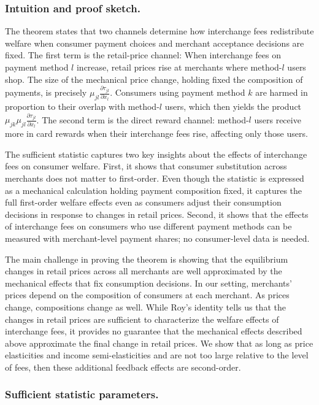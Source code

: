 \documentclass[main.tex]{subfiles}
\begin{document}
\subsubsection{Intuition and proof sketch.}

The theorem states that two channels determine how interchange fees redistribute welfare when consumer payment choices and merchant acceptance decisions are fixed.
The first term is the retail-price channel: When interchange fees on payment method $l$ increase, retail prices rise at merchants where method-$l$ users shop.
The size of the mechanical price change, holding fixed the composition of payments, is precisely $\mu_{jl} \frac{\partial \tau_{jl}}{\partial x_l}$.
Consumers using payment method $k$ are harmed in proportion to their overlap with method-$l$ users, which then yields the product $\mu_{jk}\mu_{jl} \frac{\partial \tau_{jl}}{\partial x_l}$.
The second term is the direct reward channel: method-$l$ users receive more in card rewards when their interchange fees rise, affecting only those users.

The sufficient statistic captures two key insights about the effects of interchange fees on consumer welfare.
First, it shows that consumer substitution across merchants does not matter to first-order.
Even though the statistic is expressed as a mechanical calculation holding payment composition fixed, it captures the full first-order welfare effects even as consumers adjust their consumption decisions in response to changes in retail prices.
Second, it shows that the effects of interchange fees on consumers who use different payment methods can be measured with merchant-level payment shares; no consumer-level data is needed.

The main challenge in proving the theorem is showing that the equilibrium changes in retail prices across all merchants are well approximated by the mechanical effects that fix consumption decisions.
In our setting, merchants' prices depend on the composition of consumers at each merchant.
As prices change, compositions change as well.
While Roy's identity tells us that the changes in retail prices are sufficient to characterize the welfare effects of interchange fees, it provides no guarantee that the mechanical effects described above approximate the final change in retail prices.
We show that as long as price elasticities and income semi-elasticities and are not too large relative to the level of fees, then these additional feedback effects are second-order.

\subsubsection{Sufficient statistic parameters.}
\end{document}
